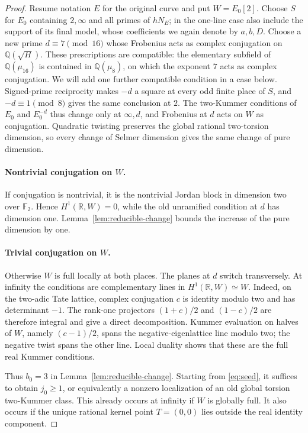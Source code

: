 \begin{proof}
Resume notation \(E\) for the original curve and put \(W=E_0[2]\).
Choose \(S\) for \(E_0\) containing \(2,\infty\) and all primes of
\(hN_E\); in the one-line case also include the support of its final
model, whose coefficients we again denote by \(a,b,D\).
Choose a new prime \(d\equiv7\pmod{16}\) whose Frobenius acts as complex
conjugation on \(\mathbb Q(\sqrt H)\).  These prescriptions are compatible:
the elementary subfield of \(\mathbb Q(\mu_{16})\) is contained in
\(\mathbb Q(\mu_8)\), on which the exponent \(7\) acts as complex
conjugation.  We will add one further compatible condition in a case
below.  Signed-prime reciprocity makes \(-d\) a square at every odd finite
place of \(S\), and \(-d\equiv1\pmod8\) gives the same conclusion at \(2\).
The two-Kummer conditions of \(E_0\) and \(E_0^{-d}\) thus change
only at \(\infty,d\), and Frobenius at \(d\) acts on \(W\) as conjugation.
Quadratic twisting preserves the global rational two-torsion dimension,
so every change of Selmer dimension gives the same change of pure dimension.

\paragraph{Nontrivial conjugation on \(W\).}
If conjugation is nontrivial, it is the nontrivial Jordan block in
dimension two over \(\mathbb F_2\).  Hence
\(H^1(\mathbb R,W)=0\), while the old unramified condition at \(d\) has
dimension one.  Lemma~\ref{lem:reducible-change} bounds the increase of
the pure dimension by one.

\paragraph{Trivial conjugation on \(W\).}
Otherwise \(W\) is full locally at both places.  The planes at \(d\)
switch transversely.  At infinity the conditions are complementary lines
in \(H^1(\mathbb R,W)\simeq W\).  Indeed, on the two-adic Tate lattice,
complex conjugation \(c\) is identity modulo two and has determinant
\(-1\).  The rank-one projectors \((1+c)/2\) and \((1-c)/2\) are therefore
integral and give a direct decomposition.  Kummer evaluation on halves
of \(W\), namely \((c-1)/2\), spans the negative-eigenlattice line modulo
two; the negative twist spans the other line.  Local duality shows that
these are the full real Kummer conditions.

Thus \(b_0=3\) in Lemma~\ref{lem:reducible-change}.  Starting from
\eqref{eq:seed}, it suffices to obtain \(j_0\ge1\), or equivalently a
nonzero localization of an old global torsion two-Kummer class.  This
already occurs at infinity if \(W\) is globally full.  It also occurs if
the unique rational kernel point \(T=(0,0)\) lies outside the real
identity component.


\end{proof}
